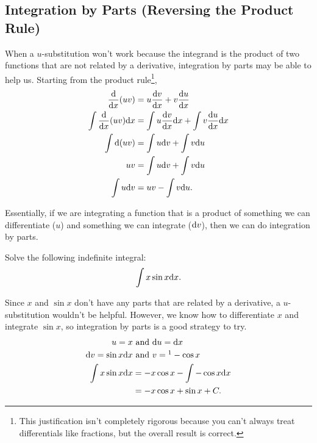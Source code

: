 \subsection{Integration by Parts (Reversing the Product Rule)}
When a $u$-substitution won't work because the integrand is the product of two functions that are not related by a derivative, integration by parts may be able to help us.
Starting from the product rule\footnote{This justification isn't completely rigorous because you can't always treat differentials like fractions, but the overall result is correct.},
\begin{align*}
	\frac{\mathrm{d}}{\mathrm{d} x}{(uv)} &= u\frac{\mathrm{d} v}{\mathrm{d} x} + v\frac{\mathrm{d} u}{\mathrm{d} x} \\
	\int{\frac{\mathrm{d} }{\mathrm{d} x}{(uv)}\mathrm{d} x} &= \int{u\frac{\mathrm{d} v}{\mathrm{d} x}\mathrm{d} x} + \int{v\frac{\mathrm{d} u}{\mathrm{d} x}\mathrm{d} x} \\
	\int{\mathrm{d} (uv)} &= \int{u\mathrm{d} v} + \int{v\mathrm{d} u} \\
	uv &= \int{u\mathrm{d} v} + \int{v\mathrm{d} u} \\
	\int{u\mathrm{d} v} &= uv - \int{v\mathrm{d} u}.
\end{align*}

Essentially, if we are integrating a function that is a product of something we can differentiate ($u$) and something we can integrate ($\mathrm{d} v$), then we can do integration by parts.
\begin{example}
	Solve the following indefinite integral:
	\begin{equation*}
		\int{x\sin{x}\mathrm{d} x}.
	\end{equation*}
\end{example}
\begin{answer}
	Since $x$ and $\sin{x}$ don't have any parts that are related by a derivative, a $u$-substitution wouldn't be helpful.
	However, we know how to differentiate $x$ and integrate $\sin{x}$, so integration by parts is a good strategy to try.
	\begin{align*}
		u = x &\text{ and } \d{u} = \d{x} \\
		\d{v} = \sin{x}\d{x} &\text{ and } v =\footnotemark -\cos{x} \\
		\int{x\sin{x}\d{x}} &= -x\cos{x} - \int{-\cos{x}\d{x}} \\
		&= -x\cos{x} + \sin{x} + C.
	\end{align*}
\end{answer}

